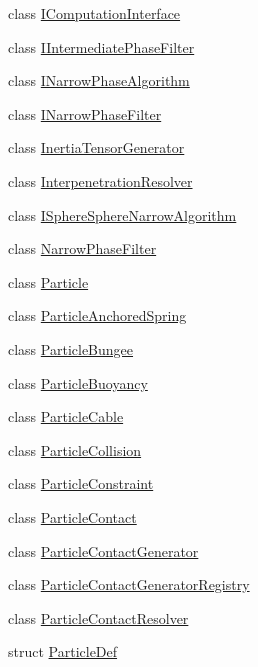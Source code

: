 \begin{DoxyCompactItemize}
\item 
class \mbox{\hyperlink{classr3_1_1_i_computation_interface}{I\+Computation\+Interface}}
\item 
class \mbox{\hyperlink{classr3_1_1_i_intermediate_phase_filter}{I\+Intermediate\+Phase\+Filter}}
\item 
class \mbox{\hyperlink{classr3_1_1_i_narrow_phase_algorithm}{I\+Narrow\+Phase\+Algorithm}}
\item 
class \mbox{\hyperlink{classr3_1_1_i_narrow_phase_filter}{I\+Narrow\+Phase\+Filter}}
\item 
class \mbox{\hyperlink{classr3_1_1_inertia_tensor_generator}{Inertia\+Tensor\+Generator}}
\item 
class \mbox{\hyperlink{classr3_1_1_interpenetration_resolver}{Interpenetration\+Resolver}}
\item 
class \mbox{\hyperlink{classr3_1_1_i_sphere_sphere_narrow_algorithm}{I\+Sphere\+Sphere\+Narrow\+Algorithm}}
\item 
class \mbox{\hyperlink{classr3_1_1_narrow_phase_filter}{Narrow\+Phase\+Filter}}
\item 
class \mbox{\hyperlink{classr3_1_1_particle}{Particle}}
\item 
class \mbox{\hyperlink{classr3_1_1_particle_anchored_spring}{Particle\+Anchored\+Spring}}
\item 
class \mbox{\hyperlink{classr3_1_1_particle_bungee}{Particle\+Bungee}}
\item 
class \mbox{\hyperlink{classr3_1_1_particle_buoyancy}{Particle\+Buoyancy}}
\item 
class \mbox{\hyperlink{classr3_1_1_particle_cable}{Particle\+Cable}}
\item 
class \mbox{\hyperlink{classr3_1_1_particle_collision}{Particle\+Collision}}
\item 
class \mbox{\hyperlink{classr3_1_1_particle_constraint}{Particle\+Constraint}}
\item 
class \mbox{\hyperlink{classr3_1_1_particle_contact}{Particle\+Contact}}
\item 
class \mbox{\hyperlink{classr3_1_1_particle_contact_generator}{Particle\+Contact\+Generator}}
\item 
class \mbox{\hyperlink{classr3_1_1_particle_contact_generator_registry}{Particle\+Contact\+Generator\+Registry}}
\item 
class \mbox{\hyperlink{classr3_1_1_particle_contact_resolver}{Particle\+Contact\+Resolver}}
\item 
struct \mbox{\hyperlink{structr3_1_1_particle_def}{Particle\+Def}}

\end{DoxyCompactItemize}
